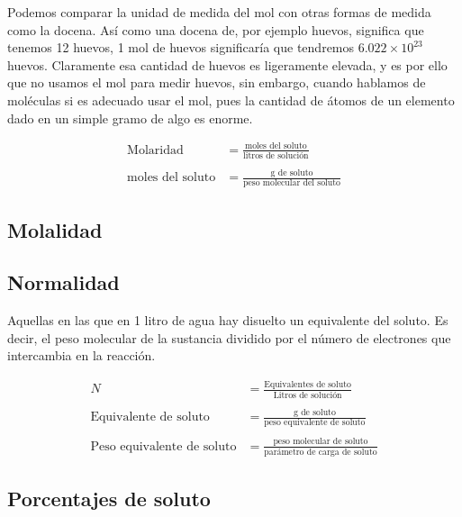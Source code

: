 
Podemos comparar la unidad de medida del mol con otras formas de medida como la docena. Así como una docena de, por ejemplo huevos, significa que tenemos 12 huevos, 1 mol de huevos significaría que tendremos $6.022 \times 10^{23}$ huevos. Claramente esa cantidad de huevos es ligeramente elevada, y es por ello que no usamos el mol para medir huevos, sin embargo, cuando hablamos de moléculas si es adecuado usar el mol, pues la cantidad de átomos de un elemento dado en un simple gramo de algo es enorme.

\begin{align*}
\text{Molaridad} &= \frac{\text{moles del soluto}}{\text{litros de solución}}
\\
\\
\text{moles del soluto} &= \frac{\text{g de soluto}}{\text{peso molecular del soluto}}
\end{align*}

\subsection{Molalidad}

\subsection{Normalidad}

Aquellas en las que en 1 litro de agua hay disuelto un equivalente del soluto. Es decir, el peso molecular de la sustancia dividido por el número de electrones que intercambia en la reacción.

\begin{align*}
    N &= \frac{\text{Equivalentes de soluto}}{\text{Litros de solución}}
    \\
    \\
    \text{Equivalente de soluto} &= \frac{\text{g de soluto}}{\text{peso equivalente de soluto}}
    \\
    \\
    \text{Peso equivalente de soluto} &= \frac{\text{peso molecular de soluto}}{\text{parámetro de carga de soluto}}
\end{align*}

\subsection{Porcentajes de soluto}


